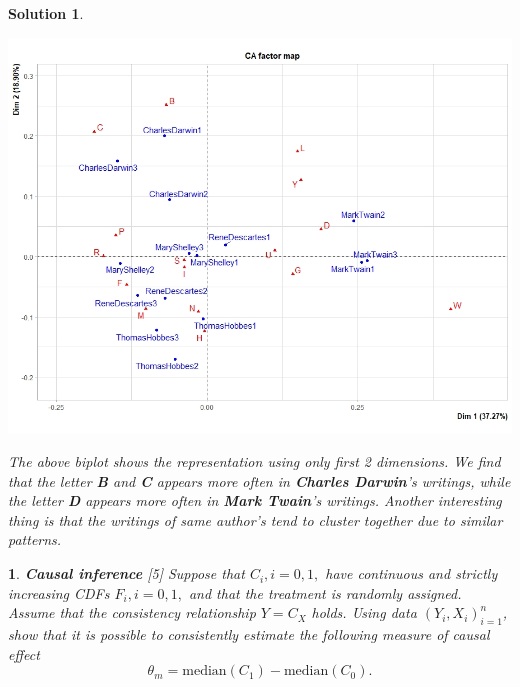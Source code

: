 \documentclass[12pt]{article}
\theoremstyle{problemstyle}
\newtheorem{problem}{}
\newtheorem*{solution*}{Solution}
\begin{document}
\begin{solution*}
\begin{enumerate}
	\begin{center}
		\includegraphics[width=\linewidth]{caplot.jpeg}
	\end{center}
	
	The above biplot shows the representation using only first 2 dimensions. We find that the letter \textbf{B} and \textbf{C} appears more often in \textbf{Charles Darwin}'s writings, while the letter \textbf{D} appears more often in \textbf{Mark Twain}'s writings. Another interesting thing is that the writings of same author's tend to cluster together due to similar patterns. 
	
	
\end{enumerate}

\end{solution*}
\vskip3pt
\begin{problem}
\textbf{Causal inference} \hfill [5]
\vskip3pt\noindent
Suppose that $C_i, i = 0, 1,$ have continuous and strictly increasing CDFs $F_i, i = 0, 1,$ and that the treatment is randomly assigned. Assume that the consistency relationship $Y = C_X$ holds. Using data $(Y_i, X_i)_{i = 1}^n$, show that it is possible to consistently estimate the following measure of causal effect
\[
    \theta_m = \mathrm{median}(C_1) - \mathrm{median}(C_0).
\]
\end{problem}
\end{document}
